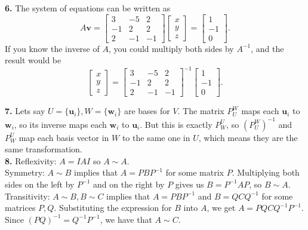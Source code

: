 \documentclass{article}
\newcommand{\bv}{\mathbf{v}}
\newcommand{\bu}{\mathbf{u}}
\newcommand{\bw}{\mathbf{w}}
\begin{document}
\textbf{6.} The system of equations can be written as
$$A\bv = \begin{bmatrix}
    3 & -5 & 2 \\
    -1 & 2 & 2 \\
    2 & -1 & -1
\end{bmatrix}
\begin{bmatrix}
    x \\
    y \\
    z
\end{bmatrix}
= \begin{bmatrix}
    1 \\
    -1 \\
    0
\end{bmatrix}.$$
If you know the inverse of $A$, you could multiply both sides by $A^{-1}$, and the result would be
$$\begin{bmatrix}
    x \\
    y \\
    z
\end{bmatrix}
= \begin{bmatrix}
    3 & -5 & 2 \\
    -1 & 2 & 2 \\
    2 & -1 & -1
\end{bmatrix}^{-1}
\begin{bmatrix}
    1 \\
    -1 \\
    0
\end{bmatrix}.$$

\textbf{7.} Lets say $U = \{\bu_i\}, W = \{\bw_i\}$ are bases for $V$. The matrix $P_U^W$ maps each $\bu_i$ to $\bw_i$, so its inverse maps each $\bw_i$ to $\bu_i$. But this is exactly $P_W^U$, so $(P_U^W)^{-1}$ and $P_W^U$ map each basis vector in $W$ to the same one in $U$, which means they are the same transformation. \\

\textbf{8.} Reflexivity: $A = IAI$ so $A\sim A$. \\

Symmetry: $A \sim B$ implies that $A = PBP^{-1}$ for some matrix $P$. Multiplying both sides on the left by $P^{-1}$ and on the right by $P$ gives us $B = P^{-1}AP$, so $B \sim A$. \\

Transitivity: $A \sim B, B\sim C$ implies that $A = PBP^{-1}$ and $B = QCQ^{-1}$ for some matrices $P, Q$. Substituting the expression for $B$ into $A$, we get $A = PQCQ^{-1}P^{-1}$. Since $(PQ)^{-1} = Q^{-1}P^{-1}$, we have that $A \sim C$. \\
\end{document}

